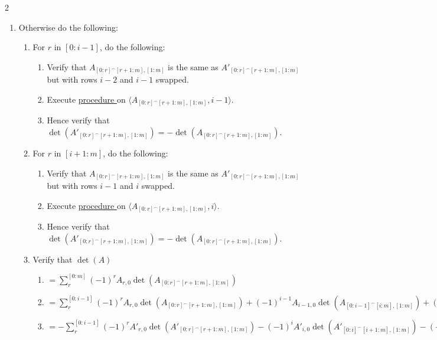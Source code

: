 \documentclass{article}
\newcounter{procedure}[part]
\newcommand{\procedurehr}[1]{\hyperref[sec:procedure #1]{procedure \expandafter\csname procedure#1\endcsname}}
\begin{document}
\begin{multicols}{2}
\begin{enumerate}
\begin{enumerate}
						\item Verify that $i=1$.
						\item Therefore verify that $\det(A')=A'_{0,0}A'_{1,1}-A'_{1,0}A'_{0,1}=A_{1,0}A_{0,1}-A_{0,0}A_{1,1}=-\det(A)$.
					\end{enumerate}
					\item Otherwise do the following:
					\begin{enumerate}
						\item For $r$ in $[0:i-1]$, do the following:
						\begin{enumerate}
							\item Verify that $A_{[0:r]^\frown[r+1:m],[1:m]}$ is the same as $A'_{[0:r]^\frown[r+1:m],[1:m]}$ but with rows $i-2$ and $i-1$ swapped.
							\item Execute \procedurehr{4.13} on $\langle A_{[0:r]^\frown[r+1:m],[1:m]},i-1\rangle$.
							\item Hence verify that $\det(A'_{[0:r]^\frown[r+1:m],[1:m]})=-\det(A_{[0:r]^\frown[r+1:m],[1:m]})$.
						\end{enumerate}
						\item For $r$ in $[i+1:m]$, do the following:
						\begin{enumerate}
							\item Verify that $A_{[0:r]^\frown[r+1:m],[1:m]}$ is the same as $A'_{[0:r]^\frown[r+1:m],[1:m]}$ but with rows $i-1$ and $i$ swapped.
							\item Execute \procedurehr{4.13} on $\langle A_{[0:r]^\frown[r+1:m],[1:m]},i\rangle$.
							\item Hence verify that $\det(A'_{[0:r]^\frown[r+1:m],[1:m]})=-\det(A_{[0:r]^\frown[r+1:m],[1:m]})$.
						\end{enumerate}
						\item Verify that $\det(A)$
						\begin{enumerate}
							\item $=\sum_r^{[0:m]} (-1)^rA_{r,0}\det(A_{[0:r]^\frown[r+1:m],[1:m]})$
							\item $=\sum_r^{[0:{i-1}]} (-1)^rA_{r,0}\det(A_{[0:r]^\frown[r+1:m],[1:m]})+(-1)^{i-1}A_{i-1,0}\det(A_{[0:i-1]^\frown[i:m],[1:m]})+(-1)^iA_{i,0}\det(A_{[0:i]^\frown[i+1:m],[1:m]})+\sum_r^{[i+1:m]} (-1)^rA_{r,0}\det(A_{[0:r]^\frown[r+1:m],[1:m]})$
							\item $=-\sum_r^{[0:{i-1}]} (-1)^rA'_{r,0}\det(A'_{[0:r]^\frown[r+1:m],[1:m]})-(-1)^{i}A'_{i,0}\det(A'_{[0:i]^\frown[i+1:m],[1:m]})-(-1)^{i-1}A'_{i-1,0}\det(A'_{[0:i-1]^\frown[i:m],[1:m]})-\sum_r^{[i+1:m]} (-1)^rA'_{r,0}\det(A'_{[0:r]^\frown[r+1:m],[1:m]})$

\end{enumerate}
\end{enumerate}
\end{enumerate}
\end{multicols}
\end{document}
